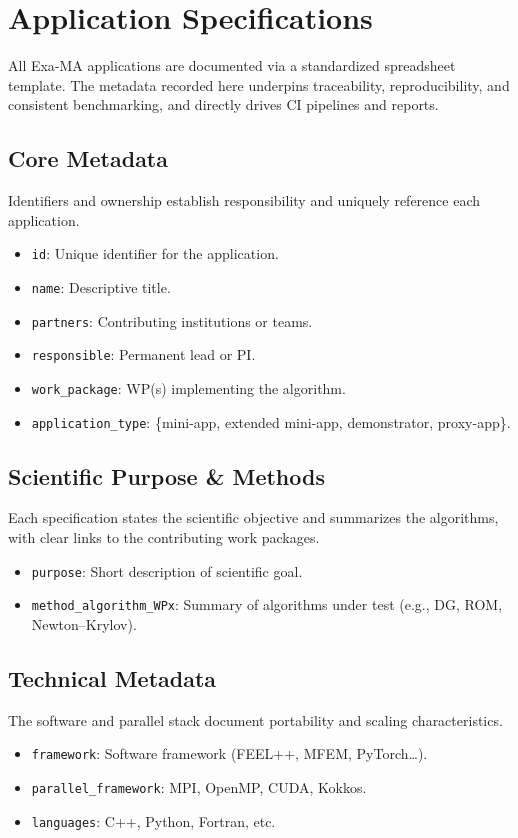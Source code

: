 \section{Application Specifications}
\label{sec:apps-specs}

All Exa‑MA applications are documented via a standardized spreadsheet template. The metadata recorded here underpins traceability, reproducibility, and consistent benchmarking, and directly drives CI pipelines and reports.

\subsection{Core Metadata}
Identifiers and ownership establish responsibility and uniquely reference each application.
\begin{itemize}
  \item \texttt{id}: Unique identifier for the application.  
  \item \texttt{name}: Descriptive title.  
  \item \texttt{partners}: Contributing institutions or teams.  
  \item \texttt{responsible}: Permanent lead or PI.  
  \item \texttt{work\_package}: WP(s) implementing the algorithm.  
  \item \texttt{application\_type}: \{mini-app, extended mini-app, demonstrator, proxy-app\}.
\end{itemize}

\subsection{Scientific Purpose \& Methods}
Each specification states the scientific objective and summarizes the algorithms, with clear links to the contributing work packages.
\begin{itemize}
  \item \texttt{purpose}: Short description of scientific goal.  
  \item \texttt{method\_algorithm\_WPx}: Summary of algorithms under test (e.g., DG, ROM, Newton–Krylov).
\end{itemize}

\subsection{Technical Metadata}
The software and parallel stack document portability and scaling characteristics.
\begin{itemize}
  \item \texttt{framework}: Software framework (FEEL++, MFEM, PyTorch…).  
  \item \texttt{parallel\_framework}: MPI, OpenMP, CUDA, Kokkos.  
  \item \texttt{languages}: C++, Python, Fortran, etc.
\end{itemize}

